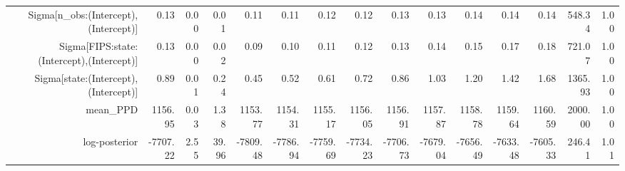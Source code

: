\begin{table}[ht]
\begin{tabular}{rrrrrrrrrrrrrrr}
  Sigma[n\_obs:(Intercept),(Intercept)] & 0.13 & 0.00 & 0.01 & 0.11 & 0.11 & 0.12 & 0.12 & 0.13 & 0.13 & 0.14 & 0.14 & 0.14 & 548.34 & 1.00 \\ 
  Sigma[FIPS:state:(Intercept),(Intercept)] & 0.13 & 0.00 & 0.02 & 0.09 & 0.10 & 0.11 & 0.12 & 0.13 & 0.14 & 0.15 & 0.17 & 0.18 & 721.07 & 1.00 \\ 
  Sigma[state:(Intercept),(Intercept)] & 0.89 & 0.01 & 0.24 & 0.45 & 0.52 & 0.61 & 0.72 & 0.86 & 1.03 & 1.20 & 1.42 & 1.68 & 1365.93 & 1.00 \\ 
  mean\_PPD & 1156.95 & 0.03 & 1.38 & 1153.77 & 1154.31 & 1155.17 & 1156.05 & 1156.91 & 1157.87 & 1158.78 & 1159.64 & 1160.59 & 2000.00 & 1.00 \\ 
  log-posterior & -7707.22 & 2.55 & 39.96 & -7809.48 & -7786.94 & -7759.69 & -7734.23 & -7706.73 & -7679.04 & -7656.49 & -7633.48 & -7605.33 & 246.41 & 1.01 \\ 
   \hline
\end{tabular}
\end{table}
